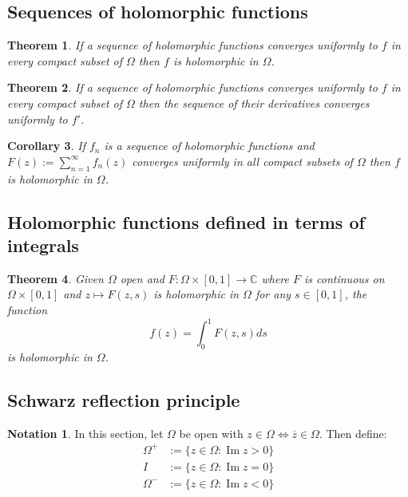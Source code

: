 \documentclass[12pt]{article}
\newtheorem{thm}{Theorem}[section]
\newtheorem{cor}[thm]{Corollary}
\theoremstyle{definition}
\newtheorem*{not*}{Notation}
\newcommand{\C}{\mathbb{C}}
\DeclareMathOperator{\im}{Im}
\begin{document}
\subsection{Sequences of holomorphic functions}

\begin{thm}
  If a sequence of holomorphic functions converges uniformly to $f$ in every compact subset of $\Omega$ then $f$ is holomorphic in $\Omega$.
\end{thm}

\begin{thm}
  If a sequence of holomorphic functions converges uniformly to $f$ in every compact subset of $\Omega$ then the sequence of their derivatives converges uniformly to $f'$.
\end{thm}

\begin{cor}
  If $f_n$ is a sequence of holomorphic functions and $F(z) := \sum_{n = 1}^{\infty}f_n(z)$ converges uniformly in all compact subsets of $\Omega$ then $f$ is holomorphic in $\Omega$.
\end{cor}

\subsection{Holomorphic functions defined in terms of integrals}

\begin{thm}
  Given $\Omega$ open and $F : \Omega \times [0, 1] \to \C$ where $F$ is continuous on $\Omega \times [0, 1]$ and $z \mapsto F(z, s)$ is holomorphic in $\Omega$ for any $s \in [0, 1]$, the function
  $$f(z) = \int_0^1F(z, s)ds$$
  is holomorphic in $\Omega$.
\end{thm}

\subsection{Schwarz reflection principle}

\begin{not*}
  In this section, let $\Omega$ be open with $z \in \Omega \iff \overline{z} \in \Omega$.
  Then define:
  \begin{align*}
    \Omega^+ &:= \{z \in \Omega : \im{z} > 0 \}\\
           I &:= \{z \in \Omega : \im{z} = 0 \}\\
    \Omega^- &:= \{z \in \Omega : \im{z} < 0 \}
  \end{align*}
\end{not*}
\end{document}
